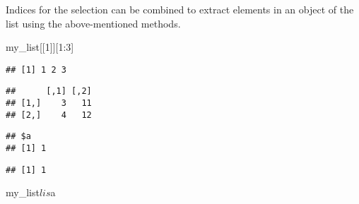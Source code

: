 \documentclass[]{book}
\newenvironment{Shaded}{\begin{snugshade}}{\end{snugshade}}
\newcommand{\KeywordTok}[1]{\textcolor[rgb]{0.13,0.29,0.53}{\textbf{{#1}}}}
\newcommand{\DecValTok}[1]{\textcolor[rgb]{0.00,0.00,0.81}{{#1}}}
\newcommand{\NormalTok}[1]{{#1}}
\begin{document}
Indices for the selection can be combined to extract elements in an
object of the list using the above-mentioned methods.

\begin{Shaded}
\begin{Highlighting}[]
\NormalTok{my_list[[}\DecValTok{1}\NormalTok{]][}\DecValTok{1}\NormalTok{:}\DecValTok{3}\NormalTok{]}
\end{Highlighting}
\end{Shaded}

\begin{verbatim}
## [1] 1 2 3
\end{verbatim}

\begin{Shaded}
\end{Shaded}

\begin{verbatim}
##      [,1] [,2]
## [1,]    3   11
## [2,]    4   12
\end{verbatim}

\begin{Shaded}
\end{Shaded}

\begin{verbatim}
## $a
## [1] 1
\end{verbatim}

\begin{Shaded}
\end{Shaded}

\begin{verbatim}
## [1] 1
\end{verbatim}

\begin{Shaded}
\begin{Highlighting}[]
\NormalTok{my_list$lis$a}
\end{Highlighting}
\end{Shaded}
\end{document}
